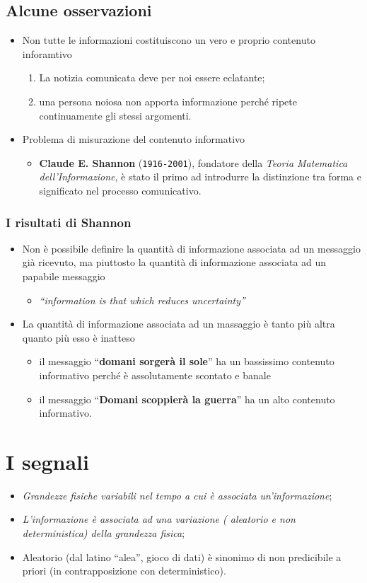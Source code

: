 \subsection{Alcune osservazioni}
\begin{itemize}
\item Non tutte le informazioni costituiscono un vero e proprio contenuto
  inforamtivo
  \begin{enumerate}
  \item La notizia comunicata deve per noi essere eclatante;
  \item una persona noiosa non apporta informazione perché ripete
    continuamente gli stessi argomenti.
  \end{enumerate}
\item Problema di misurazione del contenuto informativo
  \begin{itemize}
  \item {\bf Claude E. Shannon} ({\tt 1916-2001}), fondatore della
    \textit{Teoria Matematica dell'Informazione}, è stato il primo
    ad introdurre la distinzione tra forma e significato nel
    processo comunicativo.
  \end{itemize}
\end{itemize}
\subsubsection{I risultati di Shannon}
\begin{itemize}
	\item Non è possibile definire la quantità di informazione associata ad un
		messaggio già ricevuto, ma piuttosto la quantità di informazione
		associata ad un papabile messaggio
		\begin{itemize}
			\item \textit{``information is that which reduces uncertainty''}
		\end{itemize}
	\item La quantità di informazione associata ad un massaggio è tanto più
		altra quanto più esso è inatteso
		\begin{itemize}
			\item il messaggio ``{\bf domani sorgerà il sole}'' ha un bassissimo
				contenuto informativo perché è assolutamente scontato e banale
			\item il messaggio ``{\bf Domani scoppierà la guerra}'' ha un alto
				contenuto informativo.
		\end{itemize}
\end{itemize}
\section{I segnali}
\begin{itemize}
	\item \textit{Grandezze fisiche variabili nel tempo a cui è associata
		un'informazione};
	\item \textit{L'informazione è associata ad una variazione ({\color{red}
		aleatorio} e non deterministica) della grandezza fisica};
	\item Aleatorio (dal latino ``alea'', gioco di dati) è sinonimo di non
		predicibile a priori (in contrapposizione con deterministico).
\end{itemize}
